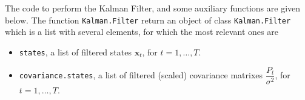\documentclass{article}\usepackage[]{graphicx}\usepackage[]{color}
\begin{document}
\vspace{0.5cm}

The code to perform the Kalman Filter, and some auxiliary functions are given below. The function \texttt{Kalman.Filter} return an object of class \texttt{Kalman.Filter} which is a list with several elements, for which the most relevant ones are 
\begin{itemize}

\item \texttt{states}, a list of filtered states $\mathbf{x}_t$, for $t = 1, \dots, T$.

\item \texttt{covariance.states}, a list of filtered (scaled) covariance matrixes $\dfrac{P_t}{\sigma^2}$,  for $t = 1, \dots, T$.
\end{itemize}
\end{document}
